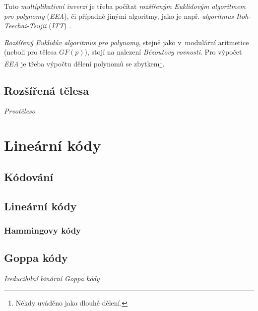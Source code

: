 \documentclass[thesis=M,czech,hidelinks]{FITthesis}[2012/06/26]
\newcommand{\0}{{\textcolor[gray]{0.80}{0}}}
\begin{document}
Tuto \emph{multiplikativní inverzi} je třeba počítat \emph{rozšířeným Euklidovým
algoritmem pro polynomy} (\emph{EEA}), či případně jinými algoritmy, jako je
např. \emph{algoritmus Itoh-Teechai-Tsujii} (\emph{ITT}) \cite{FIT_BHW,ITT}.

\emph{Rozšířený Euklidův algoritmus} \emph{pro polynomy}, stejně jako
v~modulární aritmetice (neboli pro tělesa $GF(p)$), stojí na nalezení
\emph{Bézoutovy rovnosti}. Pro výpočet \emph{EEA} je třeba výpočtu dělení
polynomů se zbytkem\footnote{
    Někdy uváděno jako dlouhé dělení.
}.

\section{Rozšířená tělesa}

\emph{Prvotěleso}





\chapter{Lineární kódy}\label{kap_kody}

\section{Kódování}

\section{Lineární kódy}
\subsection{Hammingovy kódy}

\section{Goppa kódy}
\emph{Ireducibilní binární Goppa kódy}
\end{document}
